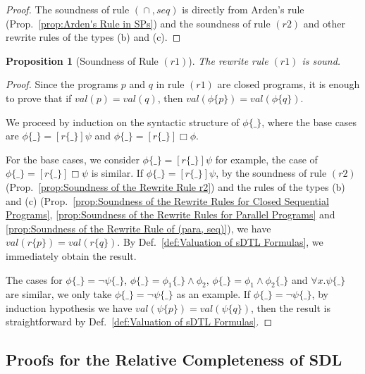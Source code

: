 \documentclass{fcs}
\newtheorem{prop}{Proposition}[section]
\newcommand{\val}[0]{\mathit{val}}
\DeclareMathOperator{\para}{\cap}
\newcommand{\place}[0]{\_}
\begin{document}
\begin{proof}
The soundness of rule $(\para, \mathit{seq})$ is directly from Arden's rule (Prop.~\ref{prop:Arden's Rule in SPs}) and the soundness of rule $(r2)$ and other rewrite rules of the types (b) and (c).
\end{proof}

\begin{prop}[Soundness of Rule $(r1)$]
    \label{prop:Soundness of the Rewrite Rule r1}
    The rewrite rule $(r1)$ is sound.
\end{prop}

\begin{proof}
    Since the programs $p$ and $q$ in rule $(r1)$ are closed programs, it is enough to prove that
    if $\val(p) = \val(q)$, then $\val(\phi\{p\}) = \val(\phi\{q\})$.

    We proceed by induction on the syntactic structure of $\phi\{\place\}$, where the base cases are $\phi\{\place\} = [r\{\place\}] \psi$ and $\phi\{\place\} = [r\{\place\}]\Box\phi$.

    For the base cases, we consider $\phi\{\place\} = [r\{\place\}] \psi$ for example, the case of $\phi\{\place\} = [r\{\place\}]\Box\psi$ is similar.
    If $\phi\{\place\} = [r\{\place\}] \psi$,
    by the soundness of rule $(r2)$ (Prop.~\ref{prop:Soundness of the Rewrite Rule r2}) and the rules of the types (b) and (c) (Prop.~\ref{prop:Soundness of the Rewrite Rules for Closed Sequential Programs}, \ref{prop:Soundness of the Rewrite Rules for Parallel Programs} and \ref{prop:Soundness of the Rewrite Rule of (para, seq)}), we have $\val(r\{p\}) = \val(r\{q\})$.
    By Def.~\ref{def:Valuation of sDTL Formulas}, we immediately obtain the result.

    The cases for $\phi\{\place\} = \neg \psi\{\place\}$, $\phi\{\place\} = \phi_1\{\place\}\wedge \phi_2$, $\phi\{\place\} = \phi_1\wedge \phi_2\{\place\}$ and $\forall x. \psi\{\place\}$ are similar, we only take
    $\phi\{\place\} = \neg \psi\{\place\}$ as an example.
    If $\phi\{\place\} = \neg \psi\{\place\}$, by induction hypothesis we have $\val(\psi\{p\}) = \val(\psi\{q\})$, then the result is straightforward by Def.~\ref{def:Valuation of sDTL Formulas}.
\end{proof}


\subsection{Proofs for the Relative Completeness of SDL}
\label{section:Proofs for the Relative Completeness of SDL}
\end{document}
